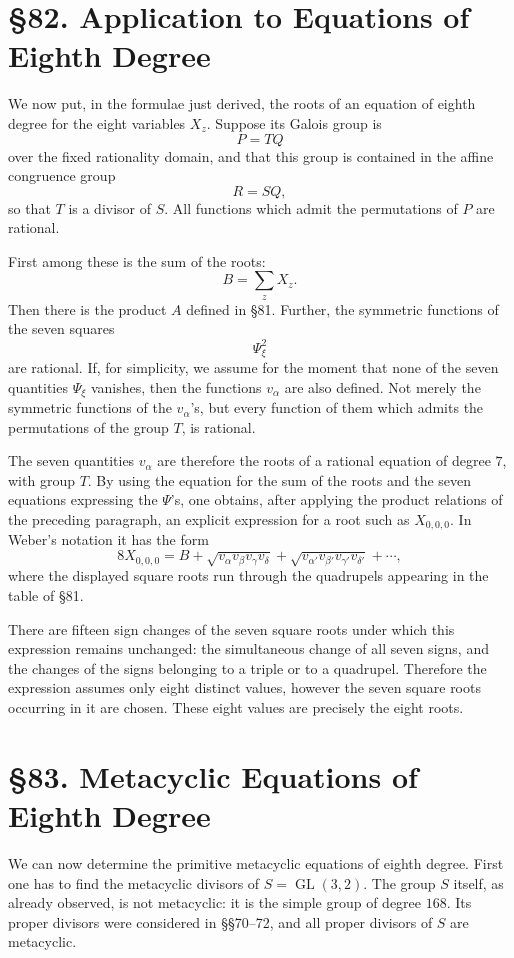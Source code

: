 \documentclass[11pt,a4paper]{book}
\newcommand{\webersection}[2]{\clearpage\section*{\S #1. #2}}
\DeclareMathOperator{\GL}{GL}
\begin{document}
\webersection{82}{Application to Equations of Eighth Degree}

We now put, in the formulae just derived, the roots of an equation of eighth degree for the eight variables \(X_z\).  Suppose its Galois group is
\[
 P=TQ
\]
over the fixed rationality domain, and that this group is contained in the affine congruence group
\[
 R=SQ,
\]
so that \(T\) is a divisor of \(S\).  All functions which admit the permutations of \(P\) are rational.

First among these is the sum of the roots:
\[
 B=\sum_z X_z.
\]
Then there is the product \(A\) defined in \S 81.  Further, the symmetric functions of the seven squares
\[
 \Psi_\xi^2
\]
are rational.  If, for simplicity, we assume for the moment that none of the seven quantities \(\Psi_\xi\) vanishes, then the functions \(v_\alpha\) are also defined.  Not merely the symmetric functions of the \(v_\alpha\)'s, but every function of them which admits the permutations of the group \(T\), is rational.

The seven quantities \(v_\alpha\) are therefore the roots of a rational equation of degree \(7\), with group \(T\).  By using the equation for the sum of the roots and the seven equations expressing the \(\Psi\)'s, one obtains, after applying the product relations of the preceding paragraph, an explicit expression for a root such as \(X_{0,0,0}\).  In Weber's notation it has the form
\[
 8X_{0,0,0}
  =B+\sqrt{v_\alpha v_\beta v_\gamma v_\delta}
      +\sqrt{v_{\alpha'}v_{\beta'}v_{\gamma'}v_{\delta'}}
      +\cdots ,
\]
where the displayed square roots run through the quadrupels appearing in the table of \S 81.

There are fifteen sign changes of the seven square roots under which this expression remains unchanged: the simultaneous change of all seven signs, and the changes of the signs belonging to a triple or to a quadrupel.  Therefore the expression assumes only eight distinct values, however the seven square roots occurring in it are chosen.  These eight values are precisely the eight roots.

\webersection{83}{Metacyclic Equations of Eighth Degree}

We can now determine the primitive metacyclic equations of eighth degree.  First one has to find the metacyclic divisors of \(S=\GL(3,2)\).  The group \(S\) itself, as already observed, is not metacyclic: it is the simple group of degree \(168\).  Its proper divisors were considered in \S\S 70--72, and all proper divisors of \(S\) are metacyclic.
\end{document}
